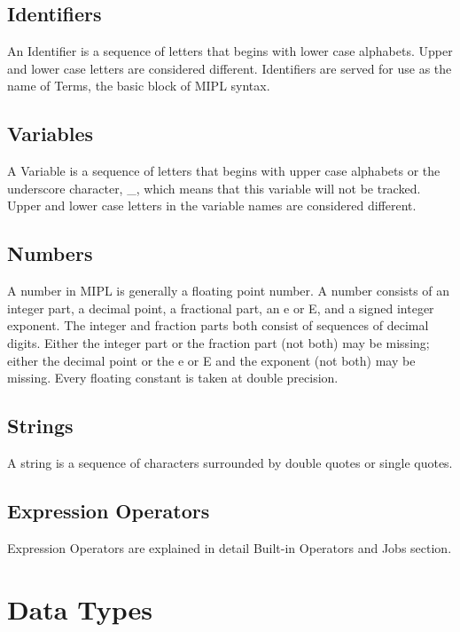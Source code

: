 \documentclass[prodmode,acmtecs]{acmsmall}
\begin{document}
\subsection{Identifiers}

An Identifier is a sequence of letters that begins with lower case alphabets.
Upper and lower case letters are considered different.   Identifiers are
served for use as the name of Terms, the basic block of MIPL syntax.
\medskip

\subsection{Variables}

A Variable is a sequence of letters that begins with upper case alphabets
or the underscore character, \_, which means that this variable will not
be tracked.  Upper and lower case letters in the variable names are
considered different. 
\medskip

\subsection{Numbers}

A number in MIPL is generally a floating point number.  A number consists of
an integer part, a decimal point, a fractional part, an e or E, and a signed 
integer exponent. The integer and fraction parts both consist of sequences of decimal
digits.
Either the integer part or the fraction part (not both) may be missing; either 
the decimal point or the e or E and the exponent (not both) may be missing.
Every floating constant is taken at double precision.
\medskip

\subsection{Strings}

A string is a sequence of characters surrounded by double quotes or single
quotes.
\medskip

\subsection{Expression Operators}
Expression Operators are explained in detail Built-in Operators and Jobs section.
\medskip

\section{Data Types}
\end{document}

